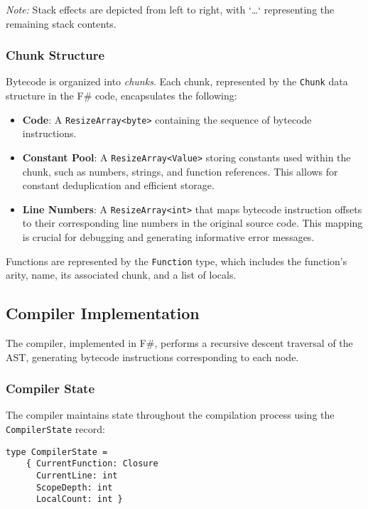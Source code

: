 \textit{Note:} Stack effects are depicted from left to right, with `\ldots` representing the remaining stack contents.

\subsubsection{Chunk Structure}

Bytecode is organized into \textit{chunks}.
Each chunk, represented by the \texttt{Chunk} data structure in the F\# code, encapsulates the following:

\begin{itemize}
    \item \textbf{Code}: A \texttt{ResizeArray<byte>} containing the sequence of bytecode instructions.
    \item \textbf{Constant Pool}: A \texttt{ResizeArray<Value>} storing constants used within the chunk, such as numbers, strings, and function references.
    This allows for constant deduplication and efficient storage.
    \item \textbf{Line Numbers}: A \texttt{ResizeArray<int>} that maps bytecode instruction offsets to their corresponding line numbers in the original source code.
    This mapping is crucial for debugging and generating informative error messages.
\end{itemize}

Functions are represented by the \texttt{Function} type, which includes the function's arity, name, its associated chunk, and a list of locals.

\subsection{Compiler Implementation}\label{subsec:compiler-implementation}

The compiler, implemented in F\#, performs a recursive descent traversal of the AST, generating bytecode 
instructions corresponding to each node.

\subsubsection{Compiler State}

The compiler maintains state throughout the compilation process using the \texttt{CompilerState} record:

\begin{verbatim}
type CompilerState =
    { CurrentFunction: Closure
      CurrentLine: int
      ScopeDepth: int
      LocalCount: int }
\end{verbatim}

